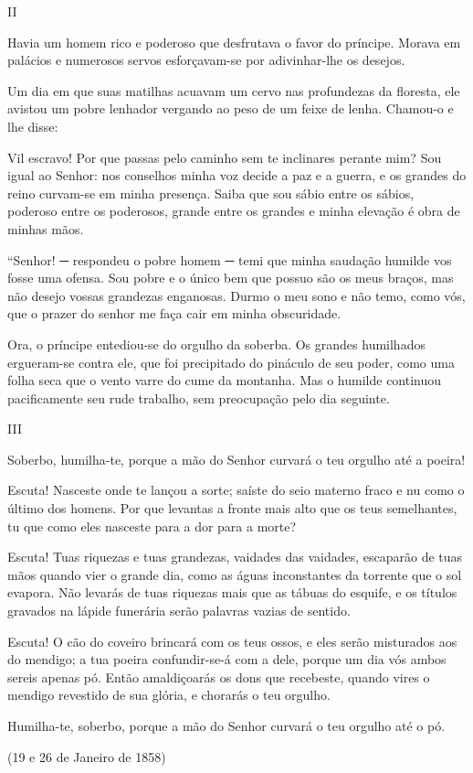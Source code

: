 \begin{center}
II
\end{center}

 \emdash{}Havia um homem rico e poderoso que desfrutava o favor do prín­cipe. Morava em palácios e numerosos servos esforçavam-se por adivinhar-lhe os desejos.

\emdash{}Um dia em que suas matilhas acuavam um cervo nas profundezas da floresta, ele avistou um pobre lenhador vergando ao peso de um feixe de lenha. Chamou-o e lhe disse:

\emdash{} Vil escravo! Por que passas pelo caminho sem te inclinares perante mim? Sou igual ao Senhor: nos conselhos minha voz decide a paz e a guerra, e os grandes do reino curvam-se em minha presença. Saiba que sou sábio entre os sábios, poderoso entre os poderosos, grande entre os grandes e minha elevação é obra de minhas mãos.

\emdash{} “Senhor! ─ respondeu o pobre homem ─ temi que minha saudação humilde vos fosse uma ofensa. Sou pobre e o único bem que possuo são os meus braços, mas não desejo vossas grandezas enganosas. Durmo o meu sono e não temo, como vós, que o prazer do senhor me faça cair em minha obscuridade.

\emdash{}Ora, o príncipe entediou-se do orgulho da soberba. Os grandes humilhados ergueram-se contra ele, que foi precipitado do pináculo de seu poder, como uma folha seca que o vento varre do cume da montanha. Mas o humilde continuou pacificamente seu rude trabalho, sem preocupação pelo dia seguinte.

 
\begin{center}
III
\end{center}
 

\emdash{}Soberbo, humilha-te, porque a mão do Senhor curvará o teu orgulho até a poeira!

\emdash{}Escuta! Nasceste onde te lançou a sorte; saíste do seio materno fraco e nu como o último dos homens. Por que levantas a fronte mais alto que os teus semelhantes, tu que como eles nasceste para a dor para a morte?

\emdash{}Escuta! Tuas riquezas e tuas grandezas, vaidades das vaidades, escaparão de tuas mãos quando vier o grande dia, como as águas inconstantes da torrente que o sol evapora. Não levarás de tuas riquezas mais que as tábuas do esquife, e os títulos gravados na lápide funerária serão palavras vazias de sentido.

\emdash{}Escuta! O cão do coveiro brincará com os teus ossos, e eles serão misturados aos do mendigo; a tua poeira confundir-se-á com a dele, porque um dia vós ambos sereis apenas pó. Então amaldiçoarás os dons que recebeste, quando vires o mendigo revestido de sua glória, e chorarás o teu orgulho.

\emdash{}Humilha-te, soberbo, porque a mão do Senhor curvará o teu orgulho até o pó.


\begin{center}
(19 e 26 de Janeiro de 1858)    
\end{center}
